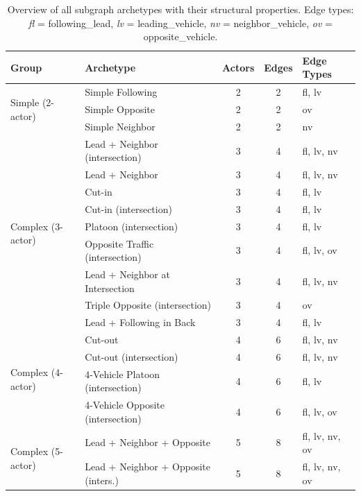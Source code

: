 \begin{table}[ht]
\centering
\caption{Overview of all subgraph archetypes with their structural properties. Edge types: \textit{fl} = following\_lead, \textit{lv} = leading\_vehicle, \textit{nv} = neighbor\_vehicle, \textit{ov} = opposite\_vehicle.}
\label{tab:subgraph_archetypes}
\begin{tabular}{llccl}
\toprule
\textbf{Group} & \textbf{Archetype} & \textbf{Actors} & \textbf{Edges} & \textbf{Edge Types} \\
\midrule
\multirow{3}{*}{Simple (2-actor)}
  & Simple Following           & 2 & 2 & fl, lv \\
  & Simple Opposite            & 2 & 2 & ov \\
  & Simple Neighbor            & 2 & 2 & nv \\
\midrule
\multirow{9}{*}{Complex (3-actor)}
  & Lead + Neighbor (intersection)       & 3 & 4 & fl, lv, nv \\
  & Lead + Neighbor                      & 3 & 4 & fl, lv, nv \\
  & Cut-in                               & 3 & 4 & fl, lv \\
  & Cut-in (intersection)                & 3 & 4 & fl, lv \\
  & Platoon (intersection)               & 3 & 4 & fl, lv \\
  & Opposite Traffic (intersection)      & 3 & 4 & fl, lv, ov \\
  & Lead + Neighbor at Intersection      & 3 & 4 & fl, lv, nv \\
  & Triple Opposite (intersection)       & 3 & 4 & ov \\
  & Lead + Following in Back             & 3 & 4 & fl, lv \\
\midrule
\multirow{4}{*}{Complex (4-actor)}
  & Cut-out                              & 4 & 6 & fl, lv, nv \\
  & Cut-out (intersection)               & 4 & 6 & fl, lv, nv \\
  & 4-Vehicle Platoon (intersection)     & 4 & 6 & fl, lv \\
  & 4-Vehicle Opposite (intersection)    & 4 & 6 & fl, lv, ov \\
\midrule
\multirow{2}{*}{Complex (5-actor)}
  & Lead + Neighbor + Opposite           & 5 & 8 & fl, lv, nv, ov \\
  & Lead + Neighbor + Opposite (inters.) & 5 & 8 & fl, lv, nv, ov \\
\bottomrule
\end{tabular}
\end{table}


